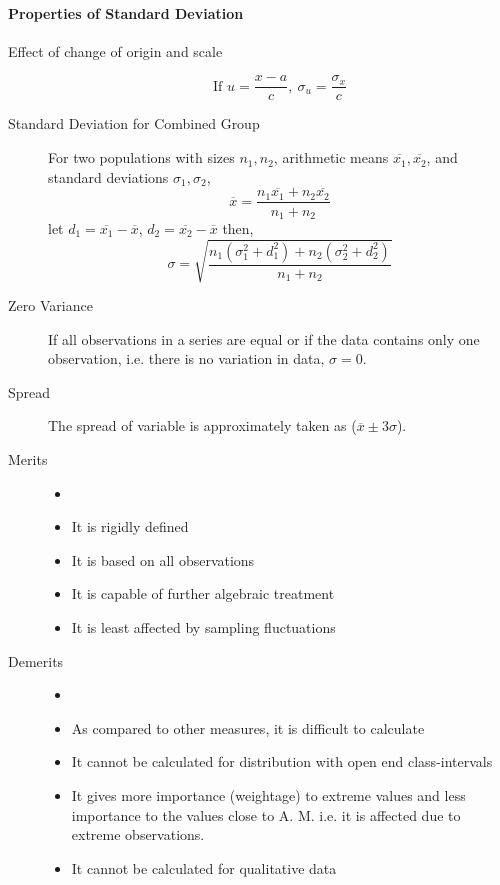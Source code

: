 \documentclass[
10pt, %
a4paper, %
]{report}
\begin{document}
\paragraph*{Properties of Standard Deviation}
\begin{description}
\item[Effect of change of origin and scale]
\[\text{If } u = \frac{x - a}{c}, \ \sigma_u = \frac{\sigma_x}{c}\]

\item[Standard Deviation for Combined Group]
For two populations with sizes \(n_1, n_2\), arithmetic means \(\overline{x_1}, \overline{x_2}\), and standard deviations \(\sigma_1, \sigma_2\),
\[ \overline{x} = \frac{n_1 \overline{x_1} + n_2 \overline{x_2}}{n_1 + n_2} \]
let \(d_1 = \overline{x_1} - \overline{x}\), \(d_2 = \overline{x_2} - \overline{x}\)
then,
\[\sigma = \sqrt{\frac{n_1(\sigma_1^2+d_1^2)+n_2(\sigma_2^2+d_2^2)}{n_1+n_2}}\]

\item[Zero Variance] If all observations in a series are equal or if the data contains only one observation, i.e. there is no variation in data, \(\sigma=0\).

\item[Spread] The spread of variable is approximately taken as (\(\overline{x} \pm 3 \sigma\)).

\item[Merits]
\begin{itemize}
\item[]
\item It is rigidly defined
\item It is based on all observations
\item It is capable of further algebraic treatment
\item It is least affected by sampling fluctuations
\end{itemize}

\item[Demerits]
\begin{itemize}
\item[]
\item As compared to other measures, it is difficult to calculate
\item It cannot be calculated for distribution with open end class-intervals
\item It gives more importance (weightage) to extreme values and less importance to the values close to A. M. i.e. it is affected due to extreme observations.
\item It cannot be calculated for qualitative data
\end{itemize}
\end{description}
\end{document}
